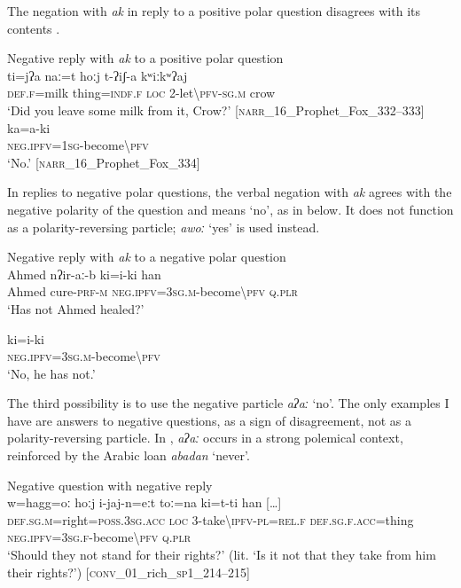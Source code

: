 \documentclass[output=paper,colorlinks,citecolor=brown]{langscibook}
\begin{document}
The negation with \textit{ak} in reply to a positive polar question disagrees with its contents .


\ea\label{ex:beja:30}
{Negative reply with \textit{ak} to a positive polar question}\\
    \ea\label{ex:beja:30a}
        \gll ti=jʔa naː=t  hoːj t-ʔiʃ-a kʷiːkʷʔaj\\
             \textsc{def.f}=milk thing=\textsc{indf.f} \textsc{loc} 2-let{\textbackslash}\textsc{pfv-sg.m} crow\\
        \glt `Did you leave some milk from it, Crow?' [\textsc{narr}\_16\_Prophet\_Fox\_332–333]
    \ex\label{ex:beja:30b}    
        \gll ka=a-ki\\
             \textsc{neg.ipfv=1sg}-become{\textbackslash}\textsc{pfv}\\
        \glt `No.' [\textsc{narr}\_16\_Prophet\_Fox\_334]
    \z
\z 

In replies to negative polar questions, the verbal negation with \textit{ak} agrees with the negative polarity of the question and means ‘no’, as in  below. It does not function as a polarity-reversing particle; \textit{awoː} ‘yes’ is used instead.

\ea\label{ex:beja:31}
{Negative reply with \textit{ak} to a negative polar question}\\
    \ea\label{ex:beja:31a}
         \gll Ahmed nʔir-aː-b ki=i-ki han\\
             Ahmed cure-\textsc{prf}-\textsc{m} \textsc{neg.ipfv=3sg.m}-become{\textbackslash}\textsc{pfv} \textsc{q.plr}\\
        \glt `Has not Ahmed healed?'
        
     \ex\label{ex:beja:31b}   
         \gll ki=i-ki\\
             \textsc{neg.ipfv=3sg.m}-become{\textbackslash}\textsc{pfv}\\
        \glt `No, he has not.'
    \z 
\z

The third possibility is to use the negative particle \textit{aʔaː} ‘no’. The only examples I have are answers to negative questions, as a sign of disagreement, not as a polarity-reversing particle. In , \textit{aʔaː} occurs in a strong polemical context, reinforced by the Arabic loan \textit{abadan} ‘never’.

\newpage
\ea\label{ex:beja:32}
{Negative question with negative reply}\\
    \ea\label{ex:beja:32a}
        \gll w=hagg=oː hoːj i-jaj-n=eːt toː=na ki=t-ti han […]\\
             \textsc{def.sg.m}=right=\textsc{poss.3sg.acc} \textsc{loc} 3-take{\textbackslash}\textsc{ipfv-pl=rel.f} \textsc{def.sg.f.acc}=thing \textsc{neg.ipfv=3sg.f}-become{\textbackslash}\textsc{pfv} \textsc{q.plr}\\
        \glt `Should they not stand for their rights?' (lit. `Is it not that they take from him their rights?') [\textsc{conv}\_01\_rich\_\textsc{sp1}\_214–215]
        
\end{document}
